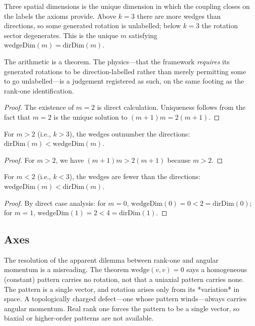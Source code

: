 \begin{theorem}
Three spatial dimensions is the unique dimension in which the coupling closes on the labels the axioms provide.
Above $k = 3$ there are more wedges than directions, so some generated rotation is unlabelled; below $k = 3$
the rotation sector degenerates. This is the unique $m$ satisfying $\text{wedgeDim}(m) = \text{dirDim}(m)$.

The arithmetic is a theorem. The physics—that the framework \emph{requires} its generated rotations to be
direction-labelled rather than merely permitting some to go unlabelled—is a judgement registered as such,
on the same footing as the rank-one identification.
\end{theorem}
\begin{proof}
The existence of $m = 2$ is direct calculation. Uniqueness follows from the fact that $m = 2$ is the unique
solution to $(m+1)m = 2(m+1)$.
\end{proof}

\begin{theorem}
For $m > 2$ (i.e., $k > 3$), the wedges outnumber the directions: $\text{dirDim}(m) < \text{wedgeDim}(m)$.
\end{theorem}
\begin{proof}
For $m > 2$, we have $(m+1)m > 2(m+1)$ because $m > 2$.
\end{proof}

\begin{theorem}
For $m < 2$ (i.e., $k < 3$), the wedges are fewer than the directions: $\text{wedgeDim}(m) < \text{dirDim}(m)$.
\end{theorem}
\begin{proof}
By direct case analysis: for $m = 0$, $\text{wedgeDim}(0) = 0 < 2 = \text{dirDim}(0)$; for $m = 1$, $\text{wedgeDim}(1) = 2 < 4 = \text{dirDim}(1)$.
\end{proof}

\subsection{Axes}

The resolution of the apparent dilemma between rank-one and angular momentum is a misreading.
The theorem $\text{wedge}(v, v) = 0$ says a homogeneous (constant) pattern carries no rotation, not that a uniaxial pattern
carries none. The pattern is a single vector, and rotation arises only from its *variation* in space.
A topologically charged defect—one whose pattern winds—always carries angular momentum.
Real rank one forces the pattern to be a single vector, so biaxial or higher-order patterns are not available.

